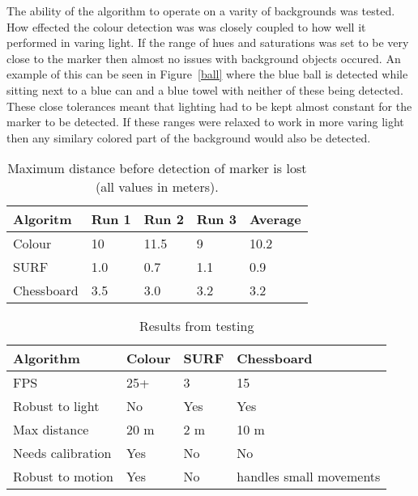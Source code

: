 The ability of the algorithm to operate on a varity of backgrounds was tested. How effected the colour detection was was closely coupled to how well it performed in varing light. If the range of hues and saturations was set to be very close to the marker then almost no issues with background objects occured. An example of this can be seen in Figure~\ref{ball} where the blue ball is detected while sitting next to a blue can and a blue towel with neither of these being detected. These close tolerances meant that lighting had to be kept almost constant for the marker to be detected. If these ranges were relaxed to work in more varing light then any similary colored part of the background would also be detected.
\begin{table}
	\begin{center}
    	\begin{tabular}{ | l | l | l | l | l |}
    	\hline
    	Algoritm & Run 1 & Run 2 & Run 3 & Average \\ \hline
		Colour & 10 & 11.5 & 9 & 10.2 \\ \hline
		SURF & 1.0 & 0.7 & 1.1 & 0.9 \\ \hline
		Chessboard & 3.5 & 3.0 & 3.2 & 3.2 \\ \hline
    	\end{tabular}
	\end{center}
	
	\caption{Maximum distance before detection of marker is lost (all values in meters).}
	\label{dist}
	
\end{table}

\begin{table}
	\begin{center}
    	\begin{tabular}{ | l | l | l | p{2.5cm} |}
    	\hline
    	Algorithm & Colour & SURF & Chessboard \\ \hline
		FPS & 25+ & 3 & 15 \\ \hline
		Robust to light & No & Yes & Yes \\ \hline
		Max distance & 20 m & 2 m & 10 m \\ \hline
		Needs calibration & Yes & No & No \\ \hline
		Robust to motion & Yes & No & handles small movements \\ \hline
    	\end{tabular}
	\end{center}
	
	\caption{Results from testing}
	\label{results}

\end{table}